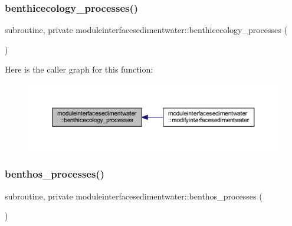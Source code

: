 \subsubsection{\texorpdfstring{benthicecology\+\_\+processes()}{benthicecology\_processes()}}
{\footnotesize\ttfamily subroutine, private moduleinterfacesedimentwater\+::benthicecology\+\_\+processes (\begin{DoxyParamCaption}{ }\end{DoxyParamCaption})\hspace{0.3cm}{\ttfamily [private]}}

Here is the caller graph for this function\+:\nopagebreak
\begin{figure}[H]
\begin{center}
\leavevmode
\includegraphics[width=350pt]{namespacemoduleinterfacesedimentwater_a474f4e07894c361e5aaa94f48648a6b1_icgraph}
\end{center}
\end{figure}
\mbox{\label{namespacemoduleinterfacesedimentwater_a6fc6699ed26c842c7951c9c436867a65}} 
\subsubsection{\texorpdfstring{benthos\+\_\+processes()}{benthos\_processes()}}
{\footnotesize\ttfamily subroutine, private moduleinterfacesedimentwater\+::benthos\+\_\+processes (\begin{DoxyParamCaption}{ }\end{DoxyParamCaption})\hspace{0.3cm}{\ttfamily [private]}}

